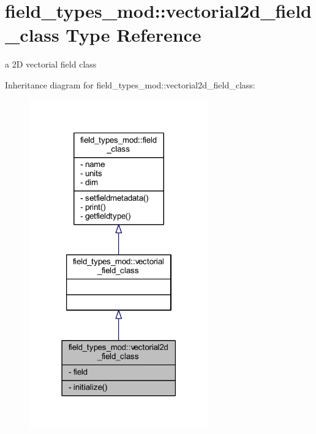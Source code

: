 \hypertarget{structfield__types__mod_1_1vectorial2d__field__class}{}\section{field\+\_\+types\+\_\+mod\+:\+:vectorial2d\+\_\+field\+\_\+class Type Reference}
\label{structfield__types__mod_1_1vectorial2d__field__class}


a 2D vectorial field class  




Inheritance diagram for field\+\_\+types\+\_\+mod\+:\+:vectorial2d\+\_\+field\+\_\+class\+:\nopagebreak
\begin{figure}[H]
\begin{center}
\leavevmode
\includegraphics[width=219pt]{structfield__types__mod_1_1vectorial2d__field__class__inherit__graph}
\end{center}
\end{figure}


